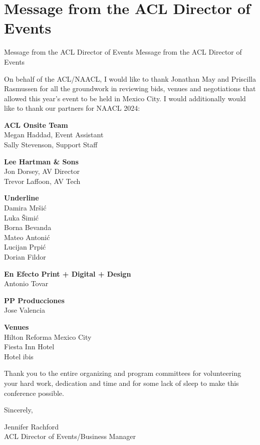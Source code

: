 \section{Message from the ACL Director of Events}\vspace{2em}
\setheaders%
    {Message from the ACL Director of Events}%
    {Message from the ACL Director of Events}
\thispagestyle{emptyheader}
\setlength{\parskip}{2ex}
\setlength{\parindent}{0pt}

On behalf of the ACL/NAACL, I would like to thank Jonathan May and Priscilla Rasmussen for all the groundwork in reviewing bids, venues and negotiations that allowed this year's event to be held in Mexico City. 
I would additionally would like to thank our partners for NAACL 2024:

\textbf{ACL Onsite Team}\\
\hspace*{0.2in}Megan Haddad, Event Assistant\\
\hspace*{0.2in}Sally Stevenson, Support Staff

\textbf{Lee Hartman \& Sons} \\
\hspace*{0.2in}Jon Dorsey, AV Director \\
\hspace*{0.2in}Trevor Laffoon, AV Tech

\textbf{Underline} \\
\hspace*{0.2in}Damira Mr\v{s}i\'c \\
\hspace*{0.2in}Luka \v{S}imi\'c \\
\hspace*{0.2in}Borna Bevanda \\
\hspace*{0.2in}Mateo Antoni\'c \\
\hspace*{0.2in}Lucijan Prpi\'c \\
\hspace*{0.2in}Dorian Fildor 

\textbf{En Efecto Print + Digital + Design} \\
\hspace*{0.2in}Antonio Tovar 

\textbf{PP Producciones} \\
\hspace*{0.2in}Jose Valencia 

\textbf{Venues} \\ 
\hspace*{0.2in}Hilton Reforma Mexico City \\
\hspace*{0.2in}Fiesta Inn Hotel  \\
\hspace*{0.2in}Hotel ibis

Thank you to the entire organizing and program committees for volunteering your hard work, dedication and time and for some lack of sleep to make this conference possible.

\vspace{1em}

Sincerely,

Jennifer Rachford\\
ACL Director of Events/Business Manager
